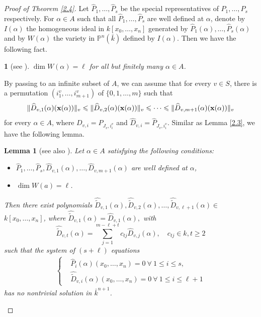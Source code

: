 \documentclass[12pt,leqno]{amsart}
\newtheorem{claim}[equation]{\indent{\it Claim}\rm }
\newtheorem{lemma}[equation]{Lemma}
\numberwithin{equation}{section}
\begin{document}
\begin{proof}[Proof of Theorem \ref{2.4}]
Let $\widehat{P}_{1}, \ldots, \widehat{P}_{s}$ be the special representatives of $P_{1},\ldots,P_{s}$ respectively. For $\alpha \in A$ such that all $\widehat{P}_{1}, \ldots, \widehat{P}_{s}$ are well defined at $\alpha$, denote by $I(\alpha)$ the homogeneous ideal in $k\left[x_0, \ldots, x_n\right]$ generated by $\widehat{P}_{1}(\alpha), \ldots, \widehat{P}_{s}(\alpha)$ and by $W(\alpha)$ the variety in $\mathbb{P}^{n}(\bar{k})$ defined by $I(\alpha)$. Then we have the following fact.
\begin{claim}[{see \cite[Lemma 2.2]{JYY}}]\label{2.7}
$\operatorname{dim} W(\alpha)=\ell$ for all but finitely many $\alpha \in A$.
\end{claim}
By passing to an infinite subset of $A$, we can assume that for every $v\in S$, there is a permutation $(i^v_1,\ldots,i^v_{m+1})$ of $\{0,1,\ldots,m\}$ such that
$$\|\widehat{D}_{v,1}(\alpha)({\bf x}(\alpha))\|_v\leqslant   \|\widehat{D}_{v,2}(\alpha)({\bf x}(\alpha))\|_v\leqslant \dots\leqslant \|\widehat{D}_{v,m+1}(\alpha)({\bf x}(\alpha))\|_v$$
for every $\alpha\in A$, where $D_{v,i}=P_{J_v,i^v_i}$ and $\widehat{D}_{v,i}=\widehat{P}_{J_v,i^v_i}$. Similar as Lemma \ref{2.3}, we have the following lemma.
\begin{lemma}[{see also \cite[Lemma 2.3]{JYY}}]\label{2.8}
Let $\alpha \in A$ satisfying the following conditions:
\begin{itemize}
\item[(i)] $\widehat{P}_{1}, \ldots, \widehat{P}_{s}, \widehat{D}_{v,1}(\alpha), \ldots, \widehat{D}_{v,m+1}(\alpha)$ are well defined at $\alpha$,
\item[(ii)] $\operatorname{dim} W(a)=\ell$.
\end{itemize}
Then there exist polynomials $\widehat{\widetilde{D}}_{v,1}(\alpha), \widehat{\widetilde{D}}_{v,2}(\alpha), \ldots, \widehat{\widetilde{D}}_{v,\ell+1}(\alpha) \in$ $k\left[x_0, \ldots, x_n\right]$, where $\widehat{\widetilde{D}}_{v,1}(\alpha)=\widehat{D}_{v,1}(\alpha),$ with
$$\widehat{\widetilde{D}}_{v,t}(\alpha)=\sum_{j=1}^{m-\ell+t} c_{tj} \widehat{D}_{v,j}(\alpha), \quad c_{tj} \in k, t\geq 2$$
such that the system of $(s+\ell)$ equations
\begin{align}\label{2.9}
\begin{cases}
&\widehat{P}_{i}(\alpha)\left(x_0, \ldots, x_n\right) =0\ \forall\ 1\leqslant i\leqslant s, \\
&\widehat{\widetilde{D}}_{v,i}(\alpha)\left(x_0, \ldots, x_n\right) =0\  \forall\ 1\leqslant i\leqslant \ell+1
\end{cases}
\end{align}
has no nontrivial solution in $\bar{k}^{n+1}$.
\end{lemma}


\end{proof}
\end{document}
